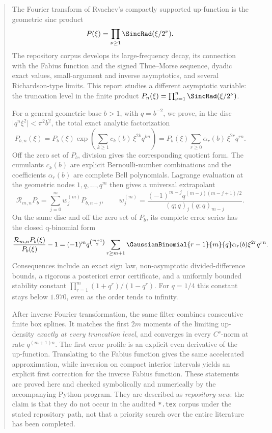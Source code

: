 \documentclass[11pt,oneside]{article}
\numberwithin{equation}{section}
\theoremstyle{definition}
\theoremstyle{remark}
\begin{document}
\begin{abstract}
The Fourier transform of Rvachev's compactly supported up-function is the geometric
sinc product
\[
   P(\xi)=\prod_{\nu\geq 1}\SincRad(\xi/2^\nu).
\]
The repository corpus develops its large-frequency decay, its connection with the
Fabius function and the signed Thue--Morse sequence, dyadic exact values,
small-argument and inverse asymptotics, and several Richardson-type limits.
This report studies a different asymptotic variable: the truncation level in the
finite product
\(P_n(\xi)=\prod_{\nu=1}^n\SincRad(\xi/2^\nu)\).

For a general geometric base \(b>1\), with \(q=b^{-2}\), we prove, in the
disc \(\lvert q^n\xi^2\rvert<\pi^2b^2\), the total exact analytic factorization
\[
 P_{b,n}(\xi)
 =P_b(\xi)\exp\!\left(\sum_{k\geq1}c_k(b)\,\xi^{2k}q^{kn}\right)
 =P_b(\xi)\sum_{r\geq0}\alpha_r(b)\,\xi^{2r}q^{rn}.
\]
Off the zero set of \(P_b\), division gives the corresponding quotient form.
The cumulants \(c_k(b)\) are explicit Bernoulli-number combinations and the
coefficients \(\alpha_r(b)\) are complete Bell polynomials. Lagrange evaluation
at the geometric nodes \(1,q,\ldots,q^m\) then gives a universal extrapolant
\[
 \mathcal R_{m,n}P_b=\sum_{j=0}^m w_j^{(m)}P_{b,n+j},
 \qquad
 w_j^{(m)}=\frac{(-1)^{m-j}q^{(m-j)(m-j+1)/2}}
 {(q;q)_j(q;q)_{m-j}}.
\]
On the same disc and off the zero set of \(P_b\), its complete error series has
the closed q-binomial form
\[
 \frac{\mathcal R_{m,n}P_b(\xi)}{P_b(\xi)}-1
 =(-1)^m q^{\binom{m+1}{2}}
 \sum_{r\geq m+1}\GaussianBinomial{r-1}{m}{q}\alpha_r(b)\xi^{2r}q^{rn}.
\]
Consequences include an exact sign law, non-asymptotic divided-difference bounds,
a rigorous a posteriori error certificate, and a uniformly bounded stability
constant \(\prod_{r=1}^m(1+q^r)/(1-q^r)\). For \(q=1/4\) this constant stays
below \(1.970\), even as the order tends to infinity.

After inverse Fourier transformation, the same filter combines consecutive finite
box splines. It matches the first \(2m\) moments of the limiting up-density
\emph{exactly at every truncation level}, and converges in every \(C^s\)-norm at
rate \(q^{(m+1)n}\). The first error profile is an explicit even derivative of
the up-function. Translating to the Fabius function gives the same accelerated
approximation, while inversion on compact interior intervals yields an explicit
first correction for the inverse Fabius function. These statements are proved
here and checked symbolically and numerically by the accompanying Python program.
They are described as \emph{repository-new}: the claim is that they do not occur
in the audited \texttt{*.tex} corpus under the stated repository path, not that a
priority search over the entire literature has been completed.
\end{abstract}
\end{document}
